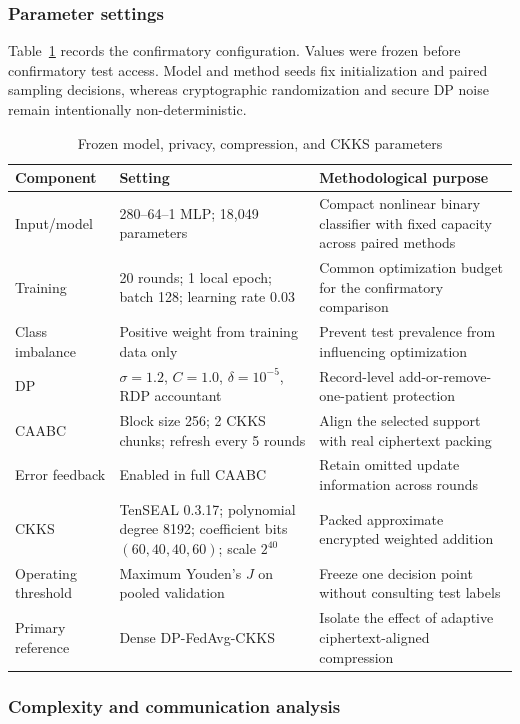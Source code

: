 \subsubsection{Parameter settings}

Table~\ref{tab:method-parameters} records the confirmatory configuration. Values were frozen before confirmatory test access. Model and method seeds fix initialization and paired sampling decisions, whereas cryptographic randomization and secure DP noise remain intentionally non-deterministic.

\begin{table}[htbp]
\centering
\caption{Frozen model, privacy, compression, and CKKS parameters}
\label{tab:method-parameters}
\small
\begin{tabularx}{\textwidth}{@{}p{3.5cm}p{3.0cm}X@{}}
\toprule
Component & Setting & Methodological purpose \\
\midrule
Input/model & 280--64--1 MLP; 18,049 parameters & Compact nonlinear binary classifier with fixed capacity across paired methods \\
Training & 20 rounds; 1 local epoch; batch 128; learning rate 0.03 & Common optimization budget for the confirmatory comparison \\
Class imbalance & Positive weight from training data only & Prevent test prevalence from influencing optimization \\
DP & $\sigma=1.2$, $C=1.0$, $\delta=10^{-5}$, RDP accountant & Record-level add-or-remove-one-patient protection \\
CAABC & Block size 256; 2 CKKS chunks; refresh every 5 rounds & Align the selected support with real ciphertext packing \\
Error feedback & Enabled in full CAABC & Retain omitted update information across rounds \\
CKKS & TenSEAL 0.3.17; polynomial degree 8192; coefficient bits $(60,40,40,60)$; scale $2^{40}$ & Packed approximate encrypted weighted addition \\
Operating threshold & Maximum Youden's $J$ on pooled validation & Freeze one decision point without consulting test labels \\
Primary reference & Dense DP-FedAvg-CKKS & Isolate the effect of adaptive ciphertext-aligned compression \\
\bottomrule
\end{tabularx}
\end{table}

\subsubsection{Complexity and communication analysis}

